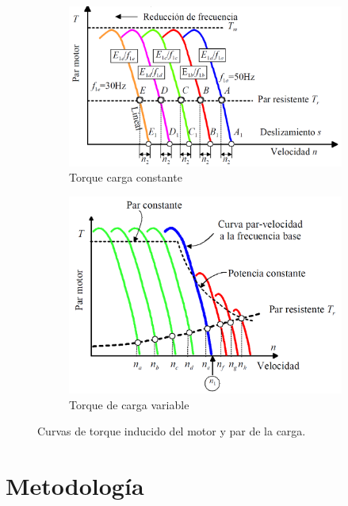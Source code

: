  
 \begin{figure}
 	\centering
 	\begin{subfigure}[b]{0.49\textwidth}
 		\centering
 		\includegraphics[width=\textwidth]{Imagenes/TorqueConstante}
 		\caption{Torque carga constante}
 		\label{fig:torqueconstante}
 	\end{subfigure}
 	\hfill
 	\begin{subfigure}[b]{0.49\textwidth}
 		\centering
 		\includegraphics[width=\textwidth]{Imagenes/TorqueVariable}
 		\caption{Torque de carga variable}
 		\label{fig:torquevariable}
 	\end{subfigure}
 	\caption{Curvas de torque inducido del motor y par de la carga. \cite{Mora08}}
 \end{figure}
 
 
 
\section{Metodología}

